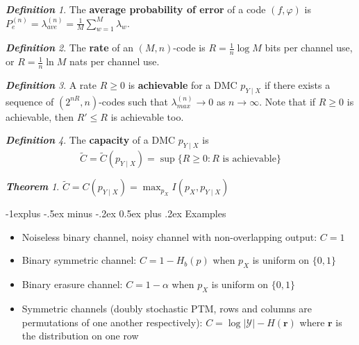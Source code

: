 \documentclass[frenchspacing,9pt,landscape,a4paper]{article}
\makeatletter
\renewcommand{\subsection}{\@startsection{subsection}{2}{0mm}%
                                {-1explus -.5ex minus -.2ex}%
                                {0.5ex plus .2ex}%
                                {\normalfont\normalsize\bfseries}}
\newcommand{\mb}[1]{\mathbf #1}
\newcommand{\abs}[1]{\left\lvert #1 \right\rvert}
\theoremstyle{remark}
\newtheorem*{thm}{\textbf{Theorem}}
\newtheorem*{defn}{\textbf{Definition}}
\makeatother
\begin{document}
\begin{multicols}{4}
\begin{defn}
    The \textbf{average probability of error} of a code $(f,\varphi)$ is
    $P_e^{(n)}=\lambda_{ave}^{(n)}=\frac{1}{M}\sum_{w=1}^M\lambda_w$.
\end{defn}
\begin{defn}
    The \textbf{rate} of an $(M,n)$-code is  $R=\frac{1}{n}\log M$ bits per channel use, or
    $R=\frac{1}{n}\ln M$ nats per channel use.
\end{defn}
\begin{defn}
    A rate $R\geq 0$ is \textbf{achievable} for a DMC  $p_{Y\mid X}$ if there exists a sequence of
    $(2^{nR},n)$-codes such that  $\lambda_{max}^{(n)}\to 0$ as  $n\to\infty$. Note that if $R\geq 0$ is
    achievable, then  $R'\leq R$ is achievable too.
\end{defn}
\begin{defn}
    The \textbf{capacity} of a DMC $p_{Y\mid X}$ is
    \[\tilde{C}=\tilde{C}(p_{Y\mid X})=\sup\{R\geq 0: R\text{ is achievable}\}\]
\end{defn}
\begin{thm}
    $\tilde{C}=C(p_{Y\mid X})=\max_{p_X} I(p_X,p_{Y\mid X})$
\end{thm}
\subsection{Examples}
\begin{itemize}
    \item Noiseless binary channel, noisy channel with non-overlapping output: $C=1$
    \item Binary symmetric channel:  $C=1-H_b(p)$ when  $p_X$ is uniform on  $\{0,1\}$
    \item Binary erasure channel:  $C=1-\alpha$ when  $p_X$ is uniform on  $\{0,1\}$
    \item Symmetric channels (doubly stochastic PTM, rows and columns are permutations of one another respectively):
        $C=\log\abs{\mathcal{Y}}-H(\mb{r})$ where  $\mb{r}$ is the distribution on one row
\end{itemize}

\end{multicols}
\end{document}
